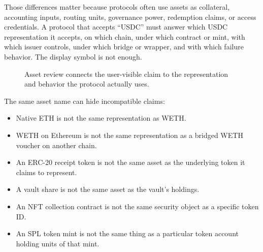 Those differences matter because protocols often use assets as collateral, accounting inputs, routing units, governance power, redemption claims, or access credentials. A protocol that accepts ``USDC'' must answer which USDC representation it accepts, on which chain, under which contract or mint, with which issuer controls, under which bridge or wrapper, and with which failure behavior. The display symbol is not enough.

\begin{figure}[htbp]
\centering
{}
\caption{Asset review connects the user-visible claim to the representation and behavior the protocol actually uses.}
\end{figure}

The same asset name can hide incompatible claims:

\begin{itemize}
\item Native ETH is not the same representation as WETH.
\item WETH on Ethereum is not the same representation as a bridged WETH voucher on another chain.
\item An ERC-20 receipt token is not the same asset as the underlying token it claims to represent.
\item A vault share is not the same asset as the vault's holdings.
\item An NFT collection contract is not the same security object as a specific token ID.
\item An SPL token mint is not the same thing as a particular token account holding units of that mint.
\end{itemize}

